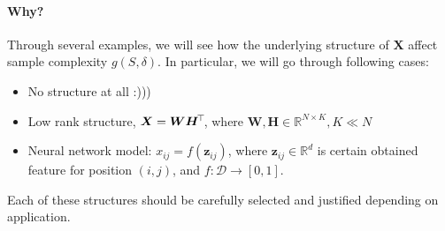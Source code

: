 \documentclass[11pt,a4paper]{article}
\begin{document}
\paragraph{Why?} Through several examples, we will see how the underlying structure of $\bm{X}$ affect sample complexity $g(S, \delta)$. In particular, we will go through following cases:
\begin{itemize}
    \item No structure at all :)))
    \item Low rank structure, $\bm{X} = \bm{W} \bm{H}^{\!\top\!}$, where $\bm{W}, \bm{H} \in \mathbb{R}^{N \times K}, K \ll N$
    \item Neural network model: $x_{ij} = f(\bm{z}_{ij})$, where $\bm{z}_{ij} \in \mathbb{R}^{d}$ is certain obtained feature for position $(i,j)$, and $f: \mathcal{D} \to [0,1]$.
\end{itemize}
Each of these structures should be carefully selected and justified depending on application.
\end{document}
